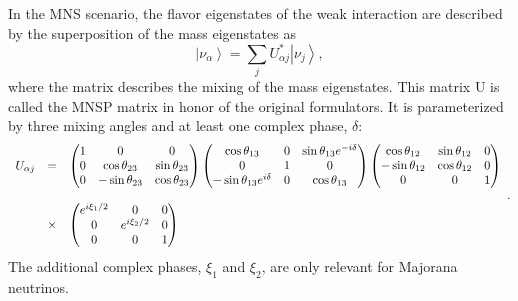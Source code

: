 In the MNS scenario, the flavor eigenstates of the weak interaction are described by the superposition of the mass eigenstates as
\begin{equation}
\left| \nu_{\alpha} \right> = \sum_{j} U^*_{\alpha j} \left| \nu_{j}\right>,
\end{equation}
where the matrix describes the mixing of the mass eigenstates. This matrix U is called the MNSP matrix in honor of the original formulators. It is parameterized by three mixing angles and at least one complex phase, $\delta$:
\begin{equation}
\label{eq:osc_matrix}
\begin{array}{l c l}
U_{\alpha j} & = &
\begin{pmatrix}
1 & 0 & 0 \\
0 & \cos \theta_{23} & \sin \theta_{23}\\ 
0 & -\sin \theta_{23} & \cos \theta_{23} 
\end{pmatrix}
\begin{pmatrix}
\cos \theta_{13} & 0 &  \sin \theta_{13}e^{-i\delta}\\
0 & 1 & 0\\ 
-\sin \theta_{13}e^{i\delta} & 0 & \cos \theta_{13}
\end{pmatrix}
\begin{pmatrix} 
\cos \theta_{12} & \sin \theta_{12}  & 0\\ 
-\sin \theta_{12} & \cos \theta_{12}  & 0\\
0 & 0 & 1
\end{pmatrix} 
\\
\\
 & \times & \begin{pmatrix}
 e^{i\xi_{1}/2} & 0 & 0\\ 
0 & e^{i\xi_{2}/2} & 0\\ 
0 & 0 & 1
\end{pmatrix}
\end{array}.
\end{equation}
The additional complex phases,  $\xi_1$ and $\xi_2$, are only relevant for Majorana neutrinos. 

